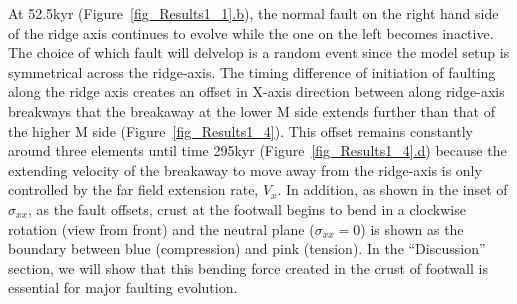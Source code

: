 At 52.5kyr (Figure~\hyperref[fig_Results1_1]{\ref{fig_Results1_1}.b}), the normal fault on the right hand side of the ridge axis continues to evolve while the one on the left becomes inactive. The choice of which fault will delvelop is a random event since the model setup is symmetrical across the ridge-axis. The timing difference of initiation of faulting along the ridge axis creates an offset in X-axis direction between along ridge-axis breakways that the breakaway at the lower M side extends further than that of the higher M side (Figure~\hyperref[fig_Results1_4]{\ref{fig_Results1_4}}). This offset remains constantly around three elements until time 295kyr (Figure~\hyperref[fig_Results1_4]{\ref{fig_Results1_4}.d}) because the extending velocity of the breakaway to move away from the ridge-axis is only controlled by the far field extension rate, $V_{x}$.  In addition, as shown in the inset of $\sigma_{xx}$, as the fault offsets, crust at the footwall begins to bend in a clockwise rotation (view from front) and the neutral plane ($\sigma_{xx}=0$) is shown as the boundary between blue (compression) and pink (tension). In the ``Discussion'' section, we will show that this bending force created in the crust of footwall is essential for major faulting evolution.


